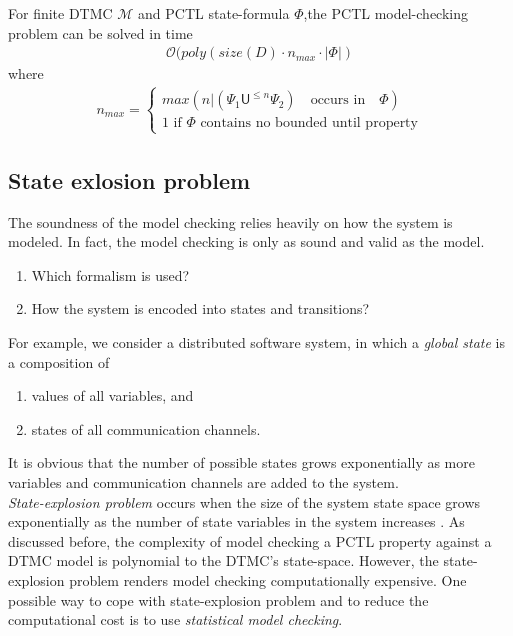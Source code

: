 \begin{theorem}
      For finite DTMC $\mathcal{M}$ and PCTL state-formula $\Phi$,the PCTL model-checking problem can be solved in time
      \begin{align*}
            \mathcal{O}(poly(size(D)\cdot n_{max} \cdot |\Phi|)
      \end{align*}
      where
      \begin{align*}
            n_{max} =
            \begin{cases}
                  max(n | (\Psi_1 \mathsf{U}^{\leq n} \Psi_2) \quad\text{occurs in}\quad \Phi) \\
                  1 \text{ if $\Phi$ contains no bounded until property}
            \end{cases}
      \end{align*}
\end{theorem}

\subsection{State exlosion problem}
The soundness of the model checking relies heavily on how the system is modeled. In fact, the model
checking is only as sound and valid as the model.
\begin{enumerate}
      \item Which formalism is used?
      \item How the system is encoded into states and transitions?
\end{enumerate}
For example, we consider a distributed software system, in which a \textit{global state} is a
composition of
\begin{enumerate}
      \item values of all variables, and
      \item states of all communication channels.
\end{enumerate}
It is obvious that the number of possible states grows exponentially as more variables and
communication channels are added to the system.\\
\textit{State-explosion problem} occurs when the size of the system state space grows exponentially
as the number of state variables in the system increases \cite{clarke2011model}. As discussed
before, the complexity of model checking a PCTL property against a DTMC model is polynomial to the
DTMC's state-space. However, the state-explosion problem renders model checking computationally
expensive. One possible way to cope with state-explosion problem and to reduce the computational cost is to use \textit{statistical model
      checking}.

